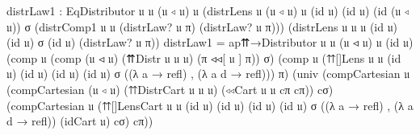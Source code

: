 \documentclass[
  11pt,
  oneside,
  article]{memoir}
\newenvironment{Shaded}{}{}
\newcommand{\NormalTok}[1]{#1}
\newcommand{\OtherTok}[1]{\textcolor[rgb]{0.00,0.44,0.13}{#1}}
\theoremstyle{definition}
\theoremstyle{plain}
\newcommand{\0}{\textsf{0}}
\newcommand{\1}{\tn{\textsf{1}}}
\begin{document}
\begin{Shaded}
\begin{Highlighting}[]
\NormalTok{    distrLaw1 }\OtherTok{:}\NormalTok{ EqDistributor 𝔲 𝔲 }\OtherTok{(}\NormalTok{𝔲 ◃ 𝔲}\OtherTok{)}\NormalTok{ 𝔲}
                    \OtherTok{(}\NormalTok{distrLens 𝔲 }\OtherTok{(}\NormalTok{𝔲 ◃ 𝔲}\OtherTok{)}\NormalTok{ 𝔲 }\OtherTok{(}\NormalTok{id 𝔲}\OtherTok{)} \OtherTok{(}\NormalTok{id 𝔲}\OtherTok{)} \OtherTok{(}\NormalTok{id }\OtherTok{(}\NormalTok{𝔲 ◃ 𝔲}\OtherTok{))}\NormalTok{ σ }
                               \OtherTok{(}\NormalTok{distrComp1 𝔲 𝔲 }\OtherTok{(}\NormalTok{distrLaw? 𝔲 π}\OtherTok{)} 
                                               \OtherTok{(}\NormalTok{distrLaw? 𝔲 π}\OtherTok{)))} 
                    \OtherTok{(}\NormalTok{distrLens 𝔲 𝔲 𝔲 }\OtherTok{(}\NormalTok{id 𝔲}\OtherTok{)} \OtherTok{(}\NormalTok{id 𝔲}\OtherTok{)}\NormalTok{ σ }\OtherTok{(}\NormalTok{id 𝔲}\OtherTok{)} 
                               \OtherTok{(}\NormalTok{distrLaw? 𝔲 π}\OtherTok{))}
\NormalTok{    distrLaw1 }\OtherTok{=} 
\NormalTok{        ap⇈→Distributor 𝔲 𝔲 }\OtherTok{(}\NormalTok{𝔲 ◃ 𝔲}\OtherTok{)}\NormalTok{ 𝔲 }\OtherTok{(}\NormalTok{id 𝔲}\OtherTok{)}
            \OtherTok{(}\NormalTok{comp 𝔲 }\OtherTok{(}\NormalTok{comp }\OtherTok{(}\NormalTok{𝔲 ◃ 𝔲}\OtherTok{)} \OtherTok{(}\NormalTok{⇈Distr 𝔲 𝔲 𝔲}\OtherTok{)} \OtherTok{(}\NormalTok{π ◃◃[ 𝔲 ] π}\OtherTok{))}\NormalTok{ σ}\OtherTok{)}
            \OtherTok{(}\NormalTok{comp 𝔲 }\OtherTok{(}\NormalTok{⇈[]Lens 𝔲 𝔲 }\OtherTok{(}\NormalTok{id 𝔲}\OtherTok{)} \OtherTok{(}\NormalTok{id 𝔲}\OtherTok{)} \OtherTok{(}\NormalTok{id 𝔲}\OtherTok{)} \OtherTok{(}\NormalTok{id 𝔲}\OtherTok{)}\NormalTok{ σ }
                             \OtherTok{((λ}\NormalTok{ a }\OtherTok{→}\NormalTok{ refl}\OtherTok{)}\NormalTok{ , }\OtherTok{(λ}\NormalTok{ a d }\OtherTok{→}\NormalTok{ refl}\OtherTok{)))} 
\NormalTok{                  π}\OtherTok{)}
            \OtherTok{(}\NormalTok{univ }\OtherTok{(}\NormalTok{compCartesian 𝔲 }
                        \OtherTok{(}\NormalTok{compCartesian }\OtherTok{(}\NormalTok{𝔲 ◃ 𝔲}\OtherTok{)} 
                            \OtherTok{(}\NormalTok{⇈DistrCart 𝔲 𝔲 𝔲}\OtherTok{)} 
                            \OtherTok{(}\NormalTok{◃◃Cart 𝔲 𝔲 cπ cπ}\OtherTok{))} 
\NormalTok{                        cσ}\OtherTok{)} 
                  \OtherTok{(}\NormalTok{compCartesian 𝔲 }
                    \OtherTok{(}\NormalTok{⇈[]LensCart 𝔲 𝔲 }\OtherTok{(}\NormalTok{id 𝔲}\OtherTok{)} \OtherTok{(}\NormalTok{id 𝔲}\OtherTok{)} \OtherTok{(}\NormalTok{id 𝔲}\OtherTok{)} \OtherTok{(}\NormalTok{id 𝔲}\OtherTok{)}\NormalTok{ σ }
                        \OtherTok{((λ}\NormalTok{ a }\OtherTok{→}\NormalTok{ refl}\OtherTok{)}\NormalTok{ , }\OtherTok{(λ}\NormalTok{ a d }\OtherTok{→}\NormalTok{ refl}\OtherTok{))} 
                        \OtherTok{(}\NormalTok{idCart 𝔲}\OtherTok{)}\NormalTok{ cσ}\OtherTok{)} 
\NormalTok{                    cπ}\OtherTok{))}
    

\end{Highlighting}
\end{Shaded}
\end{document}
